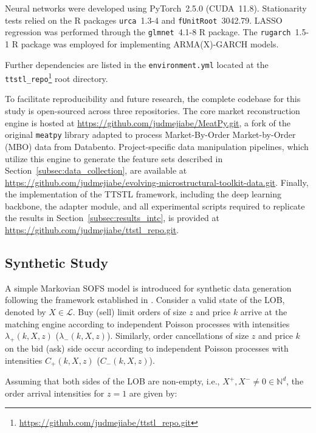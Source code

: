 \documentclass[10pt,a4paper,oneside]{article}
\newcommand{\Bo}{\mathcal{L}}
\providecommand{\DIFaddtex}[1]{{\protect\color{blue} \sf #1}} %
\providecommand{\DIFdeltex}[1]{{\protect\color{red} \scriptsize #1}} %
\providecommand{\DIFaddbegin}{} %
\providecommand{\DIFaddend}{} %
\providecommand{\DIFdelbegin}{} %
\providecommand{\DIFdelend}{} %
\providecommand{\DIFadd}[1]{\texorpdfstring{\DIFaddtex{#1}}{#1}} %
\providecommand{\DIFdel}[1]{\texorpdfstring{\DIFdeltex{#1}}{}} %
\newcommand{\DIFscaledelfig}{0.5}
\newlength{\DIFdelgraphicswidth} %
\newlength{\DIFdelgraphicsheight} %
\newcommand{\DIFaddincludegraphics}[2][]{{\color{blue}\fbox{\DIFOincludegraphics[#1]{#2}}}} %
\newcommand{\DIFdelincludegraphics}[2][]{%
\sbox{\DIFdelgraphicsbox}{\DIFOincludegraphics[#1]{#2}}%
\settoboxwidth{\DIFdelgraphicswidth}{\DIFdelgraphicsbox} %
\settoboxtotalheight{\DIFdelgraphicsheight}{\DIFdelgraphicsbox} %
\scalebox{\DIFscaledelfig}{%
\parbox[b]{\DIFdelgraphicswidth}{\usebox{\DIFdelgraphicsbox}\\[-\baselineskip] \rule{\DIFdelgraphicswidth}{0em}}\llap{\resizebox{\DIFdelgraphicswidth}{\DIFdelgraphicsheight}{%
\setlength{\unitlength}{\DIFdelgraphicswidth}%
\begin{picture}(1,1)%
\thicklines\linethickness{2pt} %
{\color[rgb]{1,0,0}\put(0,0){\framebox(1,1){}}}%
{\color[rgb]{1,0,0}\put(0,0){\line( 1,1){1}}}%
{\color[rgb]{1,0,0}\put(0,1){\line(1,-1){1}}}%
\end{picture}%
}\hspace*{3pt}}} %
} %
\DeclareRobustCommand{\DIFaddbegin}{\DIFOaddbegin \let\includegraphics\DIFaddincludegraphics} %
\DeclareRobustCommand{\DIFaddend}{\DIFOaddend \let\includegraphics\DIFOincludegraphics} %
\DeclareRobustCommand{\DIFdelbegin}{\DIFOdelbegin \let\includegraphics\DIFdelincludegraphics} %
\DeclareRobustCommand{\DIFdelend}{\DIFOaddend \let\includegraphics\DIFOincludegraphics} %
\begin{document}
Neural networks were developed using PyTorch~2.5.0 (CUDA~11.8). Stationarity tests relied on the R packages \verb|urca|~1.3-4 and \verb|fUnitRoot|~3042.79. LASSO regression was performed through the \verb|glmnet|~4.1-8 R package. The \verb|rugarch|~1.5-1 R package was employed for implementing ARMA(X)-GARCH models.

Further dependencies are listed in the \verb|environment.yml| located at the \verb|ttstl_repo|\footnote{\url{https://github.com/judmejiabe/ttstl_repo.git}} root directory.

To facilitate reproducibility and future research, the complete codebase for this study is open-sourced across three repositories. The core market reconstruction engine is hosted at \url{https://github.com/judmejiabe/MeatPy.git}, a fork of the original \verb|meatpy| library adapted to process \DIFdelbegin \DIFdel{Market-By-Order }\DIFdelend \DIFaddbegin \DIFadd{Market-by-Order }\DIFaddend (MBO) data from Databento. Project-specific data manipulation pipelines, which utilize this engine to generate the feature sets described in Section~\ref{subsec:data_collection}, are available at \url{https://github.com/judmejiabe/evolving-microstructural-toolkit-data.git}. Finally, the implementation of the TTSTL framework, including the deep learning backbone, the adapter module, and all experimental scripts required to replicate the results in Section~\ref{subsec:results_intc}, is provided at \url{https://github.com/judmejiabe/ttstl_repo.git}.

\subsection{Synthetic Study}
\label{subsec:synthetic_study}

A simple Markovian SOFS model is introduced for synthetic data generation following the framework established in \cite{cont2023mathematical}. Consider a valid state of the LOB, denoted by $X \in \Bo$. Buy (sell) limit orders of size $z$ and price $k$ arrive at the matching engine according to independent Poisson processes with intensities $\lambda_{+}(k, X, z)$ ($\lambda_{-}(k, X, z)$). Similarly, order cancellations of size $z$ and price $k$ on the bid (ask) side occur according to independent Poisson processes with intensities $C_+(k, X, z)$ ($C_-(k, X, z)$).

Assuming that both sides of the LOB are non-empty, i.e., $X^+, X^- \neq 0 \in \mathbb{N}^d$, the order arrival intensities for $z=1$ are given by:
\end{document}
